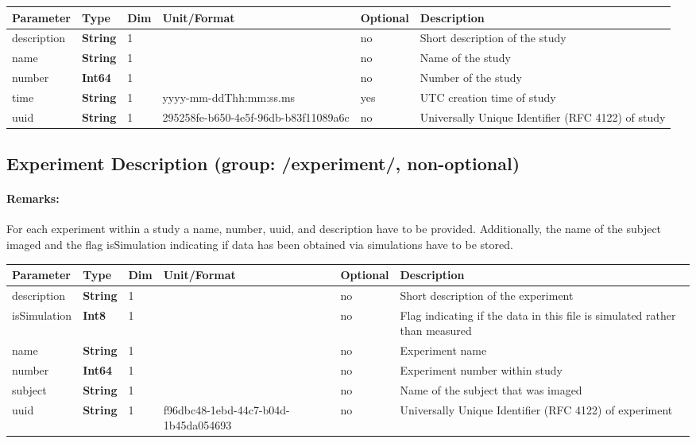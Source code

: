 \documentclass[landscape,a4paper]{article} %
\newcommand{\inltab}[1]{{\ttfamily\bfseries\color{blue}#1}}
\newcommand{\inlvar}[1]{{\ttfamily#1}}
\begin{document}
\noindent \begin{tabularx}{\columnwidth}{lllllX} 
\textbf{Parameter} & \textbf{Type} & \textbf{Dim} & \textbf{Unit/Format} & \textbf{Optional} & \textbf{Description} \\ \hline 
\inlvar{description} & \inltab{String} & 1 & & no & Short description of the study \\ \hline
\inlvar{name} & \inltab{String} & 1 & & no & Name of the study \\ \hline
\inlvar{number} & \inltab{Int64} & 1 & & no & Number of the study\\ \hline
\inlvar{time} & \inltab{String} & 1 & yyyy-mm-ddThh:mm:ss.ms & yes & UTC creation time of study \\ \hline
\inlvar{uuid} & \inltab{String} & 1 & 295258fe-b650-4e5f-96db-b83f11089a6c & no & Universally Unique Identifier (RFC 4122) of study \\ \hline 
\end{tabularx}


\subsection{Experiment Description (group: \inlvar{/experiment/}, non-optional)}

\begin{multicols}{2}
\paragraph{Remarks:} For each experiment within a study a \inlvar{name}, \inlvar{number}, \inlvar{uuid}, and \inlvar{description} have to be provided. Additionally, the name of the \inlvar{subject} imaged and the flag \inlvar{isSimulation} indicating if data has been obtained via simulations have to be stored.
\end{multicols}

\noindent \begin{tabularx}{\columnwidth}{lllllX} 
\textbf{Parameter} & \textbf{Type} & \textbf{Dim} & \textbf{Unit/Format} & \textbf{Optional} & \textbf{Description} \\ \hline 
\inlvar{description} & \inltab{String} & 1 & & no & Short description of the experiment \\ \hline
\inlvar{isSimulation} & \inltab{Int8} & 1 & & no & Flag indicating if the data in this file is simulated rather than measured \\ \hline
\inlvar{name} & \inltab{String} & 1 & & no & Experiment name \\ \hline
\inlvar{number} & \inltab{Int64} & 1 & & no & Experiment number within study\\ \hline
\inlvar{subject} & \inltab{String} & 1 & & no & Name of the subject that was imaged \\ \hline 
\inlvar{uuid} & \inltab{String} & 1 & f96dbc48-1ebd-44c7-b04d-1b45da054693 & no & Universally Unique Identifier (RFC 4122) of experiment \\ \hline 
\end{tabularx}
\end{document}
